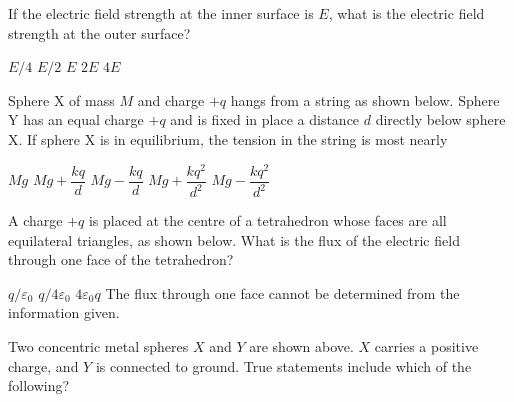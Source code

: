 \documentclass[12pt]{../../oss-apphys-exam}
\begin{document}
\begin{questions}
  \question If the electric field strength at the inner surface is $E$, what is
  the electric field strength at the outer surface?
  \begin{choices}
    \choice $E/4$
    \choice $E/2$
    \choice $E$
    \choice $2E$
    \choice $4E$
  \end{choices}
  \label{sphere2}
  \newpage
  
  \question Sphere X of mass $M$ and charge $+q$ hangs from a string as shown
  below. Sphere Y has an equal charge $+q$ and is fixed in place a distance
  $d$ directly below sphere X. If sphere X is in equilibrium, the tension in
  the string is most nearly
  \begin{choices}
    \choice$Mg$
    \choice$Mg+\dfrac{kq}d$
    \choice$Mg-\dfrac{kq}d$
    \choice$Mg+\dfrac{kq^2}{d^2}$
    \choice$Mg-\dfrac{kq^2}{d^2}$
  \end{choices}
  \newpage
  
  \question A charge $+q$ is placed at the centre of a tetrahedron whose faces
  are all equilateral triangles, as shown below. What is the flux of the
  electric field through one face of the tetrahedron?
  \begin{choices}
    \choice$q/\varepsilon_0$
    \choice$q/4\varepsilon_0$
    \choice$4\varepsilon_0q$
    \choice The flux through one face cannot be determined from the information
    given.
  \end{choices}
  \newpage
  
  \question Two concentric metal spheres $X$ and $Y$ are shown above. $X$
  carries a positive charge, and $Y$ is connected to ground. True statements
  include which of the following?


\end{questions}
\end{document}

